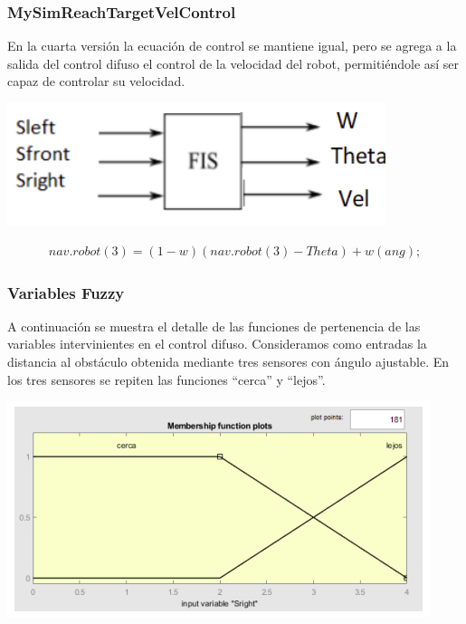 \subsubsection{MySimReachTargetVelControl}

En la cuarta versión la ecuación de control se mantiene igual, pero se agrega a la salida del control difuso el control de la velocidad del robot, permitiéndole así ser capaz de controlar su velocidad.

\begin{center}
    \includegraphics[scale=0.5]{Tesis/Capitulos/04_CAPITULO_2/img/esquema4.png}
\end{center}



\begin{equation}\boxed{
\begin{array}{rcl}
nav.robot(3)=(1-w)(nav.robot(3)-Theta) + w(ang);
\end{array}}
\end{equation}

\subsubsection{Variables Fuzzy}

A continuación se muestra el detalle de las funciones de pertenencia de las variables intervinientes en el control difuso. 
Consideramos como entradas la distancia al obstáculo obtenida mediante tres sensores con ángulo ajustable. En los tres sensores se repiten las funciones “cerca” y “lejos”.\par

\begin{center}
    \includegraphics[scale=0.5]{Tesis/Capitulos/04_CAPITULO_2/img/varfuzzy1.png}
\end{center}


